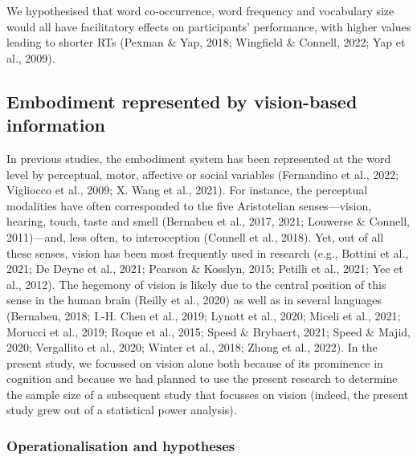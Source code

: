 \documentclass[
  12pt,
  man,floatsintext]{apa7}
\begin{document}
We hypothesised that word co-occurrence, word frequency and vocabulary size would all have facilitatory effects on participants' performance, with higher values leading to shorter RTs (Pexman \& Yap, 2018; Wingfield \& Connell, 2022; Yap et al., 2009).

\hypertarget{embodiment-represented-by-vision-based-information}{%
\subsection{Embodiment represented by vision-based information}\label{embodiment-represented-by-vision-based-information}}

In previous studies, the embodiment system has been represented at the word level by perceptual, motor, affective or social variables (Fernandino et al., 2022; Vigliocco et al., 2009; X. Wang et al., 2021). For instance, the perceptual modalities have often corresponded to the five Aristotelian senses---vision, hearing, touch, taste and smell (Bernabeu et al., 2017, 2021; Louwerse \& Connell, 2011)---and, less often, to interoception (Connell et al., 2018). Yet, out of all these senses, vision has been most frequently used in research (e.g., Bottini et al., 2021; De Deyne et al., 2021; Pearson \& Kosslyn, 2015; Petilli et al., 2021; Yee et al., 2012). The hegemony of vision is likely due to the central position of this sense in the human brain (Reilly et al., 2020) as well as in several languages (Bernabeu, 2018; I.-H. Chen et al., 2019; Lynott et al., 2020; Miceli et al., 2021; Morucci et al., 2019; Roque et al., 2015; Speed \& Brybaert, 2021; Speed \& Majid, 2020; Vergallito et al., 2020; Winter et al., 2018; Zhong et al., 2022). In the present study, we focussed on vision alone both because of its prominence in cognition and because we had planned to use the present research to determine the sample size of a subsequent study that focusses on vision (indeed, the present study grew out of a statistical power analysis).

\hypertarget{operationalisation-and-hypotheses-1}{%
\subsubsection{Operationalisation and hypotheses}\label{operationalisation-and-hypotheses-1}}
\end{document}
